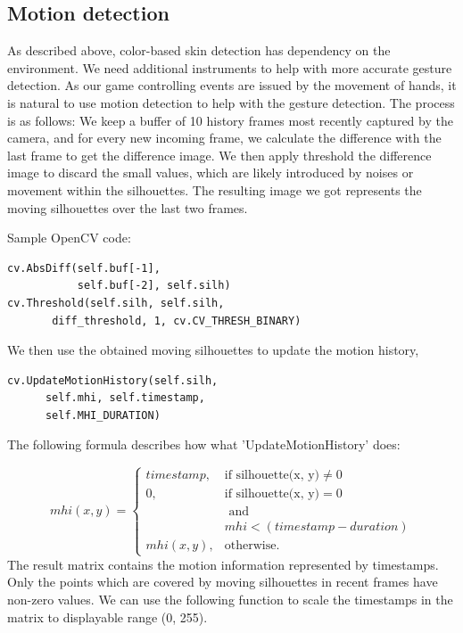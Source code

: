 \documentclass[10pt,twocolumn,letterpaper]{article}
\begin{document}
\subsection{Motion detection}
As described above, color-based skin detection has dependency on the environment. 
We need additional instruments to help with more accurate gesture detection. As our 
game controlling events are issued by the movement of hands, it is natural to use motion 
detection to help with the gesture detection. The process is as follows:
We keep a buffer of 10 history frames most recently captured by the camera, 
and for every new incoming frame, we calculate the difference with the last frame 
to get the difference image. We then apply threshold the difference image to discard 
the small values, which are likely introduced by noises or movement within the 
silhouettes. The resulting image we got represents the moving silhouettes over the 
last two frames.

Sample OpenCV code:
\begin{verbatim}
cv.AbsDiff(self.buf[-1], 
           self.buf[-2], self.silh)
cv.Threshold(self.silh, self.silh, 
       diff_threshold, 1, cv.CV_THRESH_BINARY)
\end{verbatim}

We then use the obtained moving silhouettes to update the motion history,
\begin{verbatim}
cv.UpdateMotionHistory(self.silh, 
      self.mhi, self.timestamp, 
      self.MHI_DURATION)
\end{verbatim}

The following formula describes how what 'UpdateMotionHistory' does:

\begin{equation}
mhi(x, y) = \begin{cases} timestamp, & \mbox{if silhouette(x, y)} \neq 0 \\ 
                          0, & \mbox{if silhouette(x, y)} = 0 \\
			  & \mbox{ and } \\
			  & mhi < (timestamp - duration) \\
			  mhi(x, y),  & \mbox{otherwise}.
			  \end{cases}
\end{equation}
The result matrix contains the motion information represented by timestamps. 
Only the points which are covered by moving silhouettes in recent frames 
have non-zero values. We can use the following function to scale the timestamps 
in the matrix to displayable range (0, 255).
\end{document}
